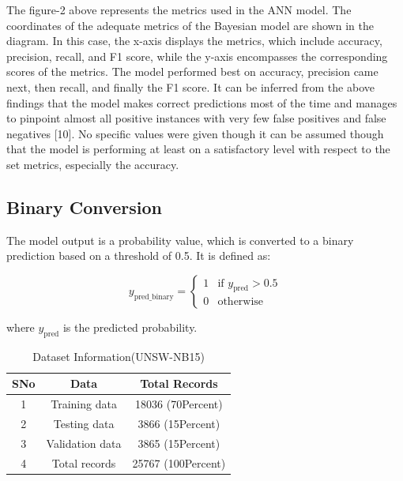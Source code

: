 \documentclass{llncs}
\begin{document}
The figure-2 above represents the metrics used in the ANN model.
The coordinates of the adequate metrics of the Bayesian model are shown in the diagram. In this case, the x-axis displays the metrics, which include accuracy, precision, recall, and F1 score, while the y-axis encompasses the corresponding scores of the metrics. The model performed best on accuracy, precision came next, then recall, and finally the F1 score. It can be inferred from the above findings that the model makes correct predictions most of the time and manages to pinpoint almost all positive instances with very few false positives and false negatives [10]. No specific values were given though it can be assumed though that the model is performing at least on a satisfactory level with respect to the set metrics, especially the accuracy.\\

\subsection{Binary Conversion}

The model output is a probability value, which is converted to a binary prediction based on a threshold of 0.5. It is defined as:

\begin{equation}
y_{\text{pred\_binary}} =
\begin{cases}
1 & \text{if } y_{\text{pred}} > 0.5 \\
0 & \text{otherwise}
\end{cases}
\end{equation}

where \( y_{\text{pred}} \) is the predicted probability.

\begin{table}[htbp]
\caption{Dataset Information(UNSW-NB15)}
\centering
\begin{tabular}{|c|c|c|}
        \hline
        SNo & Data & Total Records \\ \hline
        1 & Training data & 18036 (70Percent) \\ \hline
        2 & Testing data & 3866 (15Percent) \\ \hline
        3& Validation data & 3865 (15Percent) \\ \hline
        4 & Total records & 25767 (100Percent)\\ \hline
\end{tabular}
\label{tab 2}
\end{table}
\end{document}
